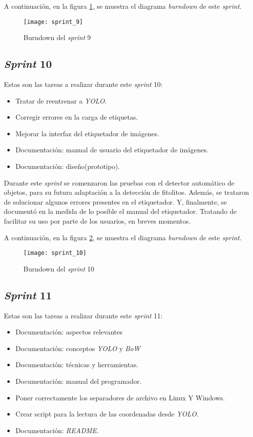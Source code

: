 A continuación, en la figura \ref{fig:A.1.10}, se muestra el diagrama \textit{burndown} de este \textit{sprint}.

\begin{figure}
\centering
\texttt{[image: sprint\_9]}
\caption{Burndown del \textit{sprint} 9}
\label{fig:A.1.10}
\end{figure}


\subsection{\textit{Sprint} 10}

Estas son las tareas a realizar durante este \textit{sprint} 10:

\begin{itemize}
	\item Tratar de reentrenar a \textit{YOLO}.
	\item Corregir errores en la carga de etiquetas.
	\item Mejorar la interfaz del etiquetador de imágenes.
	\item Documentación: manual de usuario del etiquetador de imágenes.
	\item Documentación: diseño(prototipo).
\end{itemize}

Durante este \textit{sprint} se comenzaron las pruebas con el detector automático de objetos, para su futura adaptación a la detección de fitolitos. Además, se trataron de solucionar algunos errores presentes en el etiquetador. Y, finalmente, se documentó en la medida de lo posible el manual del etiquetador. Tratando de facilitar su uso por parte de los usuarios, en breves momentos.

A continuación, en la figura \ref{fig:A.1.11}, se muestra el diagrama \textit{burndown} de este \textit{sprint}.

\begin{figure}
\centering
\texttt{[image: sprint\_10]}
\caption{Burndown del \textit{sprint} 10}
\label{fig:A.1.11}
\end{figure}

\subsection{\textit{Sprint} 11}

Estas son las tareas a realizar durante este \textit{sprint} 11:

\begin{itemize}
	\item Documentación: aspectos relevantes
	\item Documentación: conceptos \textit{YOLO} y \textit{BoW}
	\item Documentación: técnicas y herramientas.
	\item Documentación: manual del programador.
	\item Poner correctamente los separadores de archivo en Linux Y Windows.
	\item Crear script para la lectura de las coordenadas desde \textit{YOLO}.
	\item Documentación: \textit{README}.
\end{itemize}

